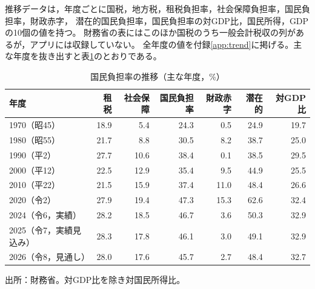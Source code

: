 \documentclass[paper=a4,fontsize=10pt]{jlreq}
\begin{document}
推移データは，年度ごとに国税，地方税，租税負担率，社会保障負担率，国民負担率，財政赤字，
潜在的国民負担率，国民負担率の対GDP比，国民所得，GDPの10個の値を持つ。
財務省の表にはこのほか国税のうち一般会計税収の列があるが，アプリには収録していない。
全年度の値を付録\ref{app:trend}に掲げる。主な年度を抜き出すと表\ref{tab:selected}のとおりである。

\begin{table}[htbp]
  \centering
  \caption{国民負担率の推移（主な年度，\%）}\label{tab:selected}
  \begin{tabular}{lrrrrrr}
    \toprule
    年度 & 租税 & 社会保障 & 国民負担率 & 財政赤字 & 潜在的 & 対GDP比 \\
    \midrule
    1970（昭45） & 18.9 & 5.4 & 24.3 & 0.5 & 24.9 & 19.7 \\
    1980（昭55） & 21.7 & 8.8 & 30.5 & 8.2 & 38.7 & 25.0 \\
    1990（平2） & 27.7 & 10.6 & 38.4 & 0.1 & 38.5 & 29.5 \\
    2000（平12） & 22.5 & 12.9 & 35.4 & 9.5 & 44.9 & 25.5 \\
    2010（平22） & 21.5 & 15.9 & 37.4 & 11.0 & 48.4 & 26.6 \\
    2020（令2） & 27.9 & 19.4 & 47.3 & 15.3 & 62.6 & 32.4 \\
    2024（令6，実績） & 28.2 & 18.5 & 46.7 & 3.6 & 50.3 & 32.9 \\
    2025（令7，実績見込み） & 28.3 & 17.8 & 46.1 & 3.0 & 49.1 & 32.9 \\
    2026（令8，見通し） & 28.0 & 17.6 & 45.7 & 2.7 & 48.4 & 32.7 \\
    \bottomrule
  \end{tabular}

  \smallskip
  {\footnotesize 出所：財務省\cite{mof2026}。対GDP比を除き対国民所得比。}
\end{table}
\end{document}
